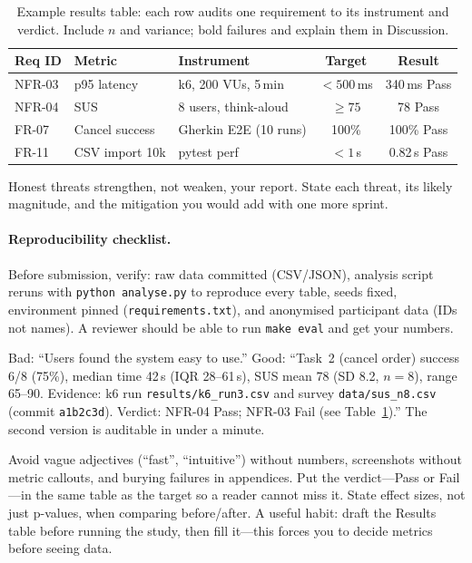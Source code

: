 \begin{table}[h]
\centering\small
\begin{tabular}{@{}lllcc@{}}
\toprule
Req ID & Metric & Instrument & Target & Result \\
\midrule
NFR-03 & p95 latency & k6, 200 VUs, 5\,min & $<500$\,ms & 340\,ms Pass \\
NFR-04 & SUS & 8 users, think-aloud & $\ge 75$ & 78 Pass \\
FR-07  & Cancel success & Gherkin E2E (10 runs) & 100\% & 100\% Pass \\
FR-11  & CSV import 10k & pytest perf & $<1$\,s & 0.82\,s Pass \\
\bottomrule
\end{tabular}
\caption{Example results table: each row audits one requirement to its instrument and verdict. Include $n$ and variance; bold failures and explain them in Discussion.}
\label{tab:results-example}
\end{table}

Honest threats strengthen, not weaken, your report. State each threat, its likely magnitude, and the mitigation you would add with one more sprint.

\paragraph{Reproducibility checklist.} Before submission, verify: raw data committed (CSV/JSON), analysis script reruns with \texttt{python analyse.py} to reproduce every table, seeds fixed, environment pinned (\texttt{requirements.txt}), and anonymised participant data (IDs not names). A reviewer should be able to run \texttt{make eval} and get your numbers.

\begin{example}
Bad: ``Users found the system easy to use.'' Good: ``Task~2 (cancel order) success 6/8 (75\%), median time 42\,s (IQR 28--61\,s), SUS mean 78 (SD 8.2, $n=8$), range 65--90. Evidence: k6 run \texttt{results/k6\_run3.csv} and survey \texttt{data/sus\_n8.csv} (commit \texttt{a1b2c3d}). Verdict: NFR-04 Pass; NFR-03 Fail (see Table~\ref{tab:results-example}).'' The second version is auditable in under a minute.
\end{example}

\begin{remark}
Avoid vague adjectives (``fast'', ``intuitive'') without numbers, screenshots without metric callouts, and burying failures in appendices. Put the verdict---Pass or Fail---in the same table as the target so a reader cannot miss it. State effect sizes, not just p-values, when comparing before/after. A useful habit: draft the Results table before running the study, then fill it---this forces you to decide metrics before seeing data.
\end{remark}

